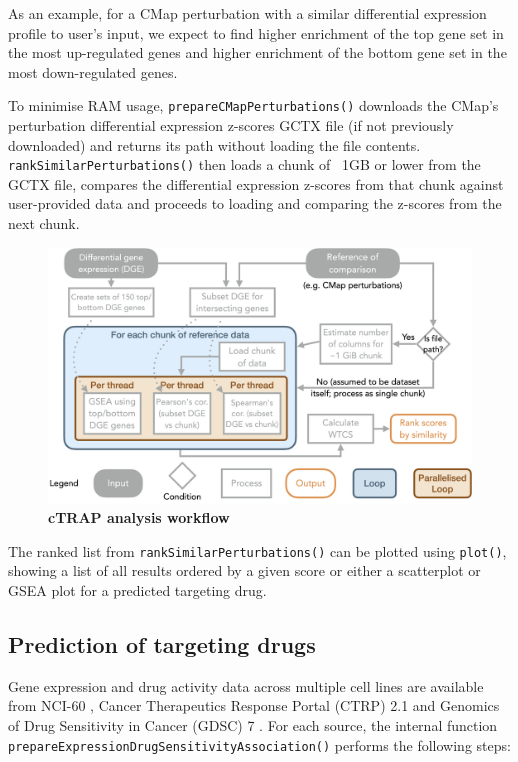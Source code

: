 As an example, for a CMap perturbation with a similar differential expression profile to user’s input, we expect to find higher enrichment of the top gene set in the most up-regulated genes and higher enrichment of the bottom gene set in the most down-regulated genes.

To minimise RAM usage, \texttt{prepareCMapPerturbations()} downloads the CMap’s perturbation differential expression z-scores GCTX file (if not previously downloaded) and returns its path without loading the file contents. \texttt{rankSimilarPerturbations()} then loads a chunk of ~1GB or lower from the GCTX file, compares the differential expression z-scores from that chunk against user-provided data and proceeds to loading and comparing the z-scores from the next chunk.

\begin{figure}[!h]
  \includegraphics[width=1\textwidth]{images/ctrap/analysis}
  \centering
  \caption[cTRAP analysis workflow]{\textbf{cTRAP analysis workflow}}
  \label{fig:ctrap-analysis}
\end{figure}

The ranked list from \texttt{rankSimilarPerturbations()} can be plotted using \texttt{plot()}, showing a list of all results ordered by a given score or either a scatterplot or GSEA plot for a predicted targeting drug.

\subsection{Prediction of targeting drugs}

Gene expression and drug activity data across multiple cell lines are available from NCI-60 \cite{shoemaker:2006wi}, Cancer Therapeutics Response Portal (CTRP) 2.1 \cite{seashore-ludlow:2015ws} and Genomics of Drug Sensitivity in Cancer (GDSC) 7 \cite{yang:2012vk}. For each source, the internal function \texttt{prepareExpressionDrugSensitivityAssociation()} performs the following steps:

